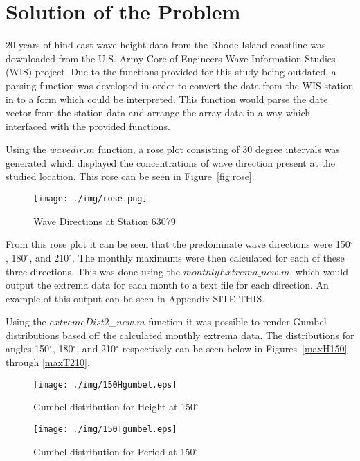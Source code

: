 \section{Solution of the Problem}

20 years of hind-cast wave height data from the Rhode Island coastline was downloaded from the U.S. Army Core of Engineers Wave Information Studies (WIS) project. Due to the functions provided for this study being outdated, a parsing function was developed in order to convert the data from the WIS station in to a form which could be interpreted. This function would parse the date vector from the station data and arrange the array data in a way which interfaced with the provided functions.

Using the $wavedir.m$ function, a rose plot consisting of 30 degree intervals was generated which displayed the concentrations of wave direction present at the studied location. This rose can be seen in Figure~\ref{fig:rose}.

\begin{figure}[H]
	\centering
	\texttt{[image: ./img/rose.png]}
	\label{fig:wis1}
	\caption{Wave Directions at Station 63079}
\end{figure}

From this rose plot it can be seen that the predominate wave directions were 150$^{\circ}$, 180$^{\circ}$, and 210$^{\circ}$. The monthly maximums were then calculated for each of these three directions. This was done using the $monthlyExtrema\_new.m$, which would output the extrema data for each month to a text file for each direction. An example of this output can be seen in Appendix SITE THIS. 

Using the $extremeDist2$\_$new.m$ function it was possible to render Gumbel distributions based off the calculated monthly extrema data. The distributions for angles 150$^{\circ}$, 180$^{\circ}$, and 210$^{\circ}$ respectively can be seen below in Figures~\ref{maxH150} through \ref{maxT210}.

\begin{figure}[H]
\centering
\begin{minipage}{0.49\textwidth}
	\texttt{[image: ./img/150Hgumbel.eps]}
	\caption{Gumbel distribution for Height at 150$^\circ$}
	\label{maxH150}
\end{minipage}
\begin{minipage}{0.49\textwidth}
	\texttt{[image: ./img/150Tgumbel.eps]}
	\caption{Gumbel distribution for Period at 150$^\circ$}
	\label{maxT150}
\end{minipage}
\end{figure}

